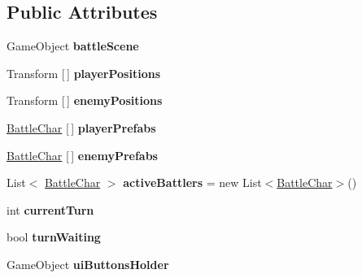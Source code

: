 \subsection*{Public Attributes}
\begin{DoxyCompactItemize}
\item 
\mbox{\label{class_battle_manager_a9ff6225611dd2c7e6b0468e93e76dbcc}} 
Game\+Object {\bfseries battle\+Scene}
\item 
\mbox{\label{class_battle_manager_a20b760fd11640f2645e64d5e0fc8b695}} 
Transform \mbox{[}$\,$\mbox{]} {\bfseries player\+Positions}
\item 
\mbox{\label{class_battle_manager_a5a3b2988ea4f8cf2bf9e574f83b3c98f}} 
Transform \mbox{[}$\,$\mbox{]} {\bfseries enemy\+Positions}
\item 
\mbox{\label{class_battle_manager_a5c92a8ab3f82e31b9fed1c6e1cf6558e}} 
\mbox{\hyperlink{class_battle_char}{Battle\+Char}} \mbox{[}$\,$\mbox{]} {\bfseries player\+Prefabs}
\item 
\mbox{\label{class_battle_manager_a5a40c7dcea1e37b28cdc862d34f311f7}} 
\mbox{\hyperlink{class_battle_char}{Battle\+Char}} \mbox{[}$\,$\mbox{]} {\bfseries enemy\+Prefabs}
\item 
\mbox{\label{class_battle_manager_a99b9c9bc101db6bf5eac1b0ae7d38731}} 
List$<$ \mbox{\hyperlink{class_battle_char}{Battle\+Char}} $>$ {\bfseries active\+Battlers} = new List$<$\mbox{\hyperlink{class_battle_char}{Battle\+Char}}$>$()
\item 
\mbox{\label{class_battle_manager_ad7d2b3cf3c34abf1d615ca169388f99b}} 
int {\bfseries current\+Turn}
\item 
\mbox{\label{class_battle_manager_aa46dd8893d49aed77cc47dedd861fd11}} 
bool {\bfseries turn\+Waiting}
\item 
\mbox{\label{class_battle_manager_aa2bdf0db6652035e37d5fd00ba1468fb}} 
Game\+Object {\bfseries ui\+Buttons\+Holder}
\item 

\end{DoxyCompactItemize}
